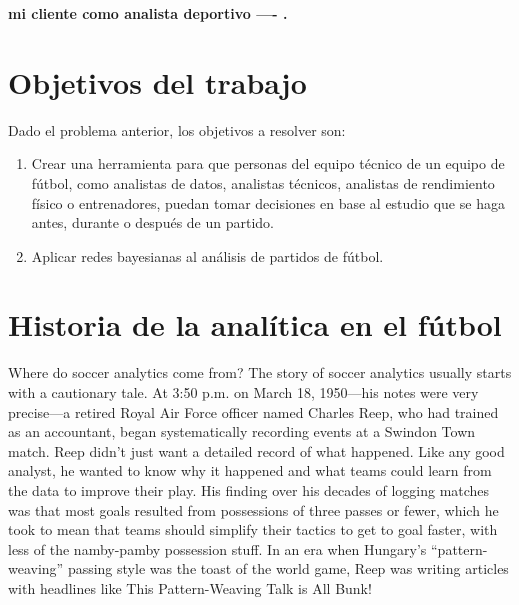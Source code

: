 \textbf{mi cliente como analista deportivo ---- .}


\section{Objetivos del trabajo} \label{sect:goals}

Dado el problema anterior, los objetivos a resolver son:

\begin{enumerate}
    \item \label{obj:1} Crear una herramienta para que personas del equipo técnico de
    un equipo de fútbol, como analistas de datos, analistas técnicos, analistas de rendimiento 
    físico o entrenadores, puedan tomar decisiones en base al estudio que se haga antes, durante 
    o después de un partido. 
    \item \label{obj:2} Aplicar redes bayesianas al análisis de partidos de fútbol.
\end{enumerate}

\section{Historia de la analítica en el fútbol}
Where do soccer analytics come from?
The story of soccer analytics usually starts with a cautionary tale. At 3:50 
p.m. on March 18, 1950—his notes were very precise—a retired Royal Air Force 
officer named Charles Reep, who had trained as an accountant, began 
systematically recording events at a Swindon Town match. Reep didn’t just 
want a detailed record of what happened. Like any good analyst, he wanted 
to know why it happened and what teams could learn from the data to 
improve their play. His finding over his decades of logging matches 
was that most goals resulted from possessions of three passes or fewer, 
which he took to mean that teams should simplify their tactics to get 
to goal faster, with less of the namby-pamby possession stuff. In an 
era when Hungary’s “pattern-weaving” passing style was the toast of 
the world game, Reep was writing articles with headlines like This 
Pattern-Weaving Talk is All Bunk!

